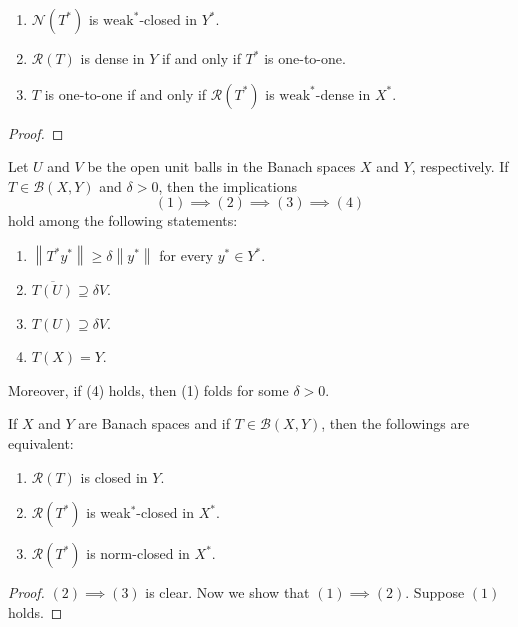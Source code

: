 \begin{corollary}
  \label{corollary-range-null-adjoint-and-annihilators}
  \begin{enumerate}
    \item \( \mathcal{N}(T^*) \) is \( \text{weak}^* \)-closed in \( Y^* \).
    \item \( \mathcal{R}(T) \) is dense in \( Y \) if and only if \( T^* \) is one-to-one.
    \item \( T \) is one-to-one if and only if \( \mathcal{R}(T^*) \) is \( \text{weak}^* \)-dense in \( X^* \).
  \end{enumerate}
\end{corollary}
\begin{proof}
  
\end{proof}

\begin{theorem}
  \label{theorem-equivalent-open-unit-ball-in-Banach-space}
  Let \( U \) and \( V \) be the open unit balls in the Banach spaces \( X \) and \( Y \), respectively.
  If \( T \in \mathcal{B}(X, Y) \) and \( \delta > 0 \), then the implications
  \[
    (1) \implies (2) \implies (3) \implies (4)
  \]
  hold among the following statements:
  \begin{enumerate}
    \item \( \left\lVert T^* y^* \right\rVert \geq \delta \left\lVert y^* \right\rVert \) for every \( y^* \in Y^* \).
    \item \( \overline{T(U)} \supseteq \delta V \).
    \item \( T(U) \supseteq \delta V \).
    \item \( T(X) = Y \).
  \end{enumerate}
  Moreover, if (4) holds, then (1) folds for some \( \delta > 0 \).
\end{theorem}

\begin{theorem}
  \label{theorem-closeness-and-adjoint}
  If \( X \) and \( Y \) are Banach spaces and if \( T \in \mathcal{B}(X, Y) \), then the followings are equivalent:
  \begin{enumerate}
    \item \( \mathcal{R}(T) \) is closed in \( Y \).
    \item \( \mathcal{R}(T^*) \) is weak\( ^* \)-closed in \( X^* \).
    \item \( \mathcal{R}(T^*) \) is norm-closed in \( X^* \).
  \end{enumerate}
\end{theorem}
\begin{proof}
  \( (2) \implies (3) \) is clear.
  Now we show that \( (1) \implies (2) \).
  Suppose \( (1) \) holds.
\end{proof}

